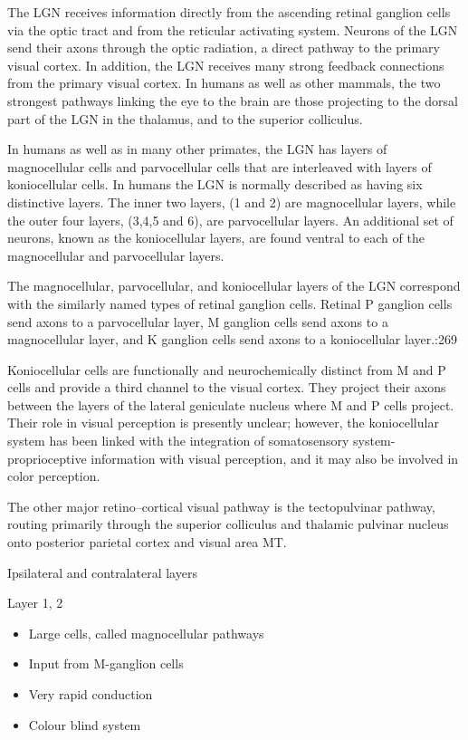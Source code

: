 \documentclass[]{book}
\providecommand{\tightlist}{%
  \setlength{\itemsep}{0pt}\setlength{\parskip}{0pt}}
\begin{document}
The LGN receives information directly from the ascending retinal ganglion cells via the optic tract and from the reticular activating system. Neurons of the LGN send their axons through the optic radiation, a direct pathway to the primary visual cortex. In addition, the LGN receives many strong feedback connections from the primary visual cortex. In humans as well as other mammals, the two strongest pathways linking the eye to the brain are those projecting to the dorsal part of the LGN in the thalamus, and to the superior colliculus.

In humans as well as in many other primates, the LGN has layers of magnocellular cells and parvocellular cells that are interleaved with layers of koniocellular cells. In humans the LGN is normally described as having six distinctive layers. The inner two layers, (1 and 2) are magnocellular layers, while the outer four layers, (3,4,5 and 6), are parvocellular layers. An additional set of neurons, known as the koniocellular layers, are found ventral to each of the magnocellular and parvocellular layers.

The magnocellular, parvocellular, and koniocellular layers of the LGN correspond with the similarly named types of retinal ganglion cells. Retinal P ganglion cells send axons to a parvocellular layer, M ganglion cells send axons to a magnocellular layer, and K ganglion cells send axons to a koniocellular layer.:269

Koniocellular cells are functionally and neurochemically distinct from M and P cells and provide a third channel to the visual cortex. They project their axons between the layers of the lateral geniculate nucleus where M and P cells project. Their role in visual perception is presently unclear; however, the koniocellular system has been linked with the integration of somatosensory system-proprioceptive information with visual perception, and it may also be involved in color perception.

The other major retino--cortical visual pathway is the tectopulvinar pathway, routing primarily through the superior colliculus and thalamic pulvinar nucleus onto posterior parietal cortex and visual area MT.

Ipsilateral and contralateral layers

Layer 1, 2

\begin{itemize}
\tightlist
\item
  Large cells, called magnocellular pathways
\item
  Input from M-ganglion cells
\item
  Very rapid conduction
\item
  Colour blind system
\end{itemize}
\end{document}
